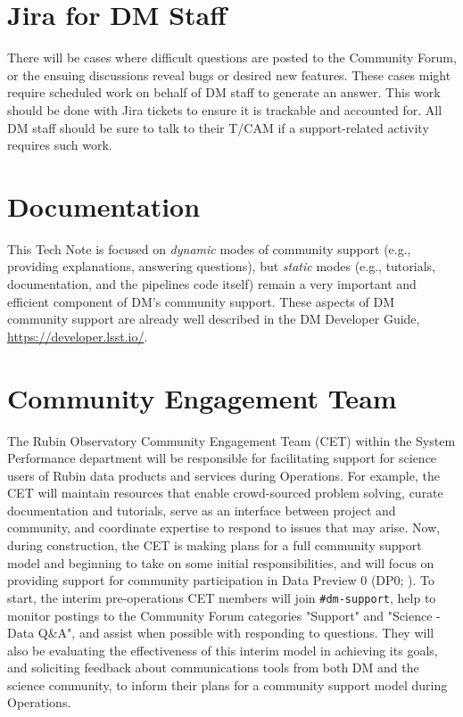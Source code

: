 \documentclass[DM,lsstdraft,authoryear,toc]{lsstdoc}
\begin{document}
\section{Jira for DM Staff}\label{sec:jira}

There will be cases where difficult questions are posted to the Community Forum, or the ensuing discussions reveal bugs or desired new features.
These cases might require scheduled work on behalf of DM staff to generate an answer.
This work should be done with Jira tickets to ensure it is trackable and accounted for.
All DM staff should be sure to talk to their T/CAM if a support-related activity requires such work.

\section{Documentation}\label{sec:doc}

This Tech Note is focused on {\it dynamic} modes of community support (e.g., providing explanations, answering questions), but {\it static} modes (e.g., tutorials, documentation, and the pipelines code itself) remain a very important and efficient component of DM's community support.
These aspects of DM community support are already well described in the DM Developer Guide, \url{https://developer.lsst.io/}.

\section{Community Engagement Team}\label{sec:cet}

The Rubin Observatory Community Engagement Team (CET) within the System Performance department will be responsible for facilitating support for science users of Rubin data products and services during Operations.
For example, the CET will maintain resources that enable crowd-sourced problem solving, curate documentation and tutorials, serve as an interface between project and community, and coordinate expertise to respond to issues that may arise.
Now, during construction, the CET is making plans for a full community support model and beginning to take on some initial responsibilities, and will focus on providing support for community participation in Data Preview 0 (DP0; ).
To start, the interim pre-operations CET members will join {\tt \#dm-support}, help to monitor postings to the Community Forum categories "Support" and "Science - Data Q\&A", and assist when possible with responding to questions.
They will also be evaluating the effectiveness of this interim model in achieving its goals, and soliciting feedback about communications tools from both DM and the science community, to inform their plans for a community support model during Operations.
\end{document}

